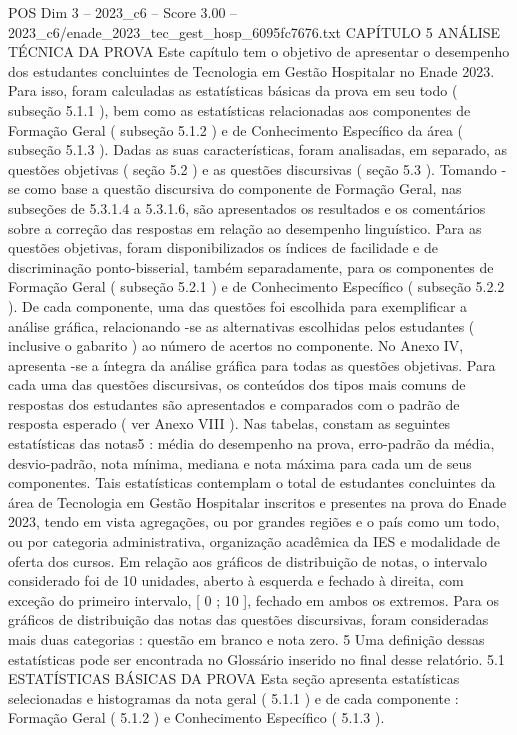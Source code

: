 \begin{textsample}{POS Dim 3 – 2023\_c6 – Score 3.00 – 2023\_c6/enade\_2023\_tec\_gest\_hosp\_6095fc7676.txt}  \label{ex:f3_pos_101}
CAPÍTULO 5 ANÁLISE TÉCNICA DA PROVA Este capítulo tem o objetivo de apresentar o desempenho dos estudantes concluintes de Tecnologia em Gestão Hospitalar no Enade 2023.
Para isso, foram calculadas as estatísticas básicas da prova em seu todo ( subseção 5.1.1 ), bem como as estatísticas relacionadas aos componentes de Formação Geral ( subseção 5.1.2 ) e de Conhecimento Específico da área ( subseção 5.1.3 ).
Dadas as suas características, foram analisadas, em separado, as questões objetivas ( seção 5.2 ) e as questões discursivas ( seção 5.3 ).
Tomando -se como base a questão discursiva do componente de Formação Geral, nas subseções de 5.3.1.4 a 5.3.1.6, são apresentados os resultados e os comentários sobre a correção das respostas em relação ao desempenho linguístico.
Para as questões objetivas, foram disponibilizados os índices de facilidade e de discriminação ponto-bisserial, também separadamente, para os componentes de Formação Geral ( subseção 5.2.1 ) e de Conhecimento Específico ( subseção 5.2.2 ).
De cada componente, uma das questões foi escolhida para exemplificar a análise gráfica, relacionando -se as alternativas escolhidas pelos estudantes ( inclusive o gabarito ) ao número de acertos no componente.
No Anexo IV, apresenta -se a íntegra da análise gráfica para todas as questões objetivas.
Para cada uma das questões discursivas, os conteúdos dos tipos mais comuns de respostas dos estudantes são apresentados e comparados com o padrão de resposta esperado ( ver Anexo VIII ).
Nas tabelas, constam as seguintes estatísticas das notas5 : média do desempenho na prova, erro-padrão da média, desvio-padrão, nota mínima, mediana e nota máxima para cada um de seus componentes.
Tais estatísticas contemplam o total de estudantes concluintes da área de Tecnologia em Gestão Hospitalar inscritos e presentes na prova do Enade 2023, tendo em vista agregações, ou por grandes regiões e o país como um todo, ou por categoria administrativa, organização acadêmica da IES e modalidade de oferta dos cursos.
Em relação aos gráficos de distribuição de notas, o intervalo considerado foi de 10 unidades, aberto à esquerda e fechado à direita, com exceção do primeiro intervalo, [ 0 ; 10 ], fechado em ambos os extremos.
Para os gráficos de distribuição das notas das questões discursivas, foram consideradas mais duas categorias : questão em branco e nota zero. 5 Uma definição dessas estatísticas pode ser encontrada no Glossário inserido no final desse relatório. 5.1 ESTATÍSTICAS BÁSICAS DA PROVA Esta seção apresenta estatísticas selecionadas e histogramas da nota geral ( 5.1.1 ) e de cada componente : Formação Geral ( 5.1.2 ) e Conhecimento Específico ( 5.1.3 ).

\end{textsample}
